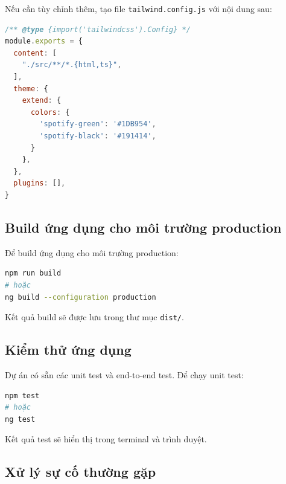 Nếu cần tùy chỉnh thêm, tạo file \texttt{tailwind.config.js} với nội dung sau:

\begin{lstlisting}[language=javascript]
/** @type {import('tailwindcss').Config} */
module.exports = {
  content: [
    "./src/**/*.{html,ts}",
  ],
  theme: {
    extend: {
      colors: {
        'spotify-green': '#1DB954',
        'spotify-black': '#191414',
      }
    },
  },
  plugins: [],
}
\end{lstlisting}

\subsection{Build ứng dụng cho môi trường production}

Để build ứng dụng cho môi trường production:

\begin{lstlisting}[language=bash]
npm run build
# hoặc
ng build --configuration production
\end{lstlisting}

Kết quả build sẽ được lưu trong thư mục \texttt{dist/}.

\subsection{Kiểm thử ứng dụng}

Dự án có sẵn các unit test và end-to-end test. Để chạy unit test:

\begin{lstlisting}[language=bash]
npm test
# hoặc
ng test
\end{lstlisting}

Kết quả test sẽ hiển thị trong terminal và trình duyệt.

\subsection{Xử lý sự cố thường gặp}


